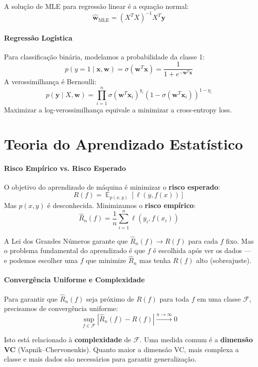\documentclass{tufte-handout}
\DeclareMathOperator{\E}{\mathbb{E}}
\begin{document}
A solução de MLE para regressão linear é a equação normal:
\[
\hat{\mathbf{w}}_{\text{MLE}} = (X^T X)^{-1} X^T \mathbf{y}
\]

\paragraph{Regressão Logística}

Para classificação binária, modelamos a probabilidade da classe 1:
\[
p(y = 1 \mid \mathbf{x}, \mathbf{w}) = \sigma(\mathbf{w}^T \mathbf{x}) = \frac{1}{1 + e^{-\mathbf{w}^T \mathbf{x}}}
\]
A verossimilhança é Bernoulli:
\[
p(\mathbf{y} \mid X, \mathbf{w}) = \prod_{i=1}^n \sigma(\mathbf{w}^T \mathbf{x}_i)^{y_i} (1 - \sigma(\mathbf{w}^T \mathbf{x}_i))^{1-y_i}
\]
Maximizar a log-verossimilhança equivale a minimizar a cross-entropy loss.

\section{Teoria do Aprendizado Estatístico}

\paragraph{Risco Empírico vs. Risco Esperado}

O objetivo do aprendizado de máquina é minimizar o \textbf{risco esperado}:
\[
R(f) = \E_{p(x,y)}[\ell(y, f(x))]
\]
Mas $p(x,y)$ é desconhecida. Minimizamos o \textbf{risco empírico}:
\[
\hat{R}_n(f) = \frac{1}{n}\sum_{i=1}^n \ell(y_i, f(x_i))
\]

A Lei dos Grandes Números garante que $\hat{R}_n(f) \to R(f)$ para cada $f$ fixo.
Mas o problema fundamental do aprendizado é que $f$ é escolhida após ver os dados ---
e podemos escolher uma $f$ que minimize $\hat{R}_n$ mas tenha $R(f)$ alto (sobreajuste).

\paragraph{Convergência Uniforme e Complexidade}

Para garantir que $\hat{R}_n(f)$ seja próximo de $R(f)$ para toda $f$ em uma classe
$\mathcal{F}$, precisamos de convergência uniforme:
\[
\sup_{f \in \mathcal{F}} |\hat{R}_n(f) - R(f)| \xrightarrow{n\to\infty} 0
\]

Isto está relacionado à \textbf{complexidade} de $\mathcal{F}$. Uma medida comum é a
\textbf{dimensão VC} (Vapnik--Chervonenkis). Quanto maior a dimensão VC, mais complexa
a classe e mais dados são necessários para garantir generalização.
\end{document}
